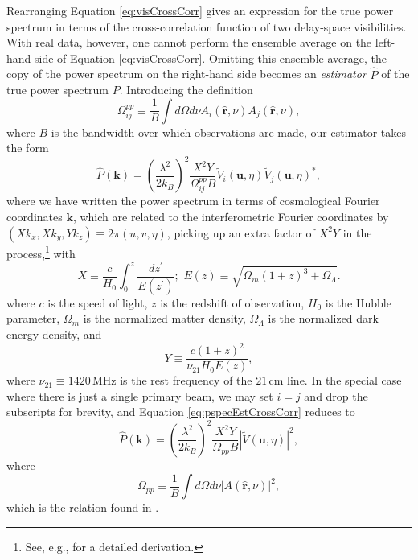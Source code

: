 \documentclass[twocolumn,apj,numberedappendix]{emulateapj}
\newcommand{\rhat}{\hat{\mathbf{r}}}
\begin{document}
Rearranging Equation \eqref{eq:visCrossCorr} gives an expression for the true power spectrum in terms of the cross-correlation function of two delay-space visibilities. With real data, however, one cannot perform the ensemble average on the left-hand side of Equation \eqref{eq:visCrossCorr}. Omitting this ensemble average, the copy of the power spectrum on the right-hand side becomes an \emph{estimator} $\widehat{P}$ of the true power spectrum $P$. Introducing the definition
\begin{equation}
\label{eq:Omega_ij_def}
\Omega_{ij}^{pp} \equiv \frac{1}{B} \int d\Omega d\nu A_i (\rhat,\nu) A_j (\rhat,\nu),
\end{equation}
where $B$ is the bandwidth over which observations are made, our estimator takes the form
\begin{equation}
\label{eq:pspecEstCrossCorr}
\widehat{P} (\mathbf{k}) = \left( \frac{\lambda^2}{2 k_B} \right)^2 \frac{X^2 Y}{\Omega^{pp}_{ij} B} \widetilde{V}_i(\mathbf{u},\eta) \widetilde{V}_j(\mathbf{u},\eta)^*,
\end{equation}
where we have written the power spectrum in terms of cosmological Fourier coordinates $\mathbf{k}$, which are related to the interferometric Fourier coordinates by $(X k_x, X k_y, Y k_z) \equiv 2 \pi (u , v, \eta)$, picking up an extra factor of $X^2 Y$ in the process,\footnote{See, e.g., \citet{liu_et_al2014a} for a detailed derivation.} with
\begin{equation}
X \equiv \frac{c}{H_0} \int_0^z \frac{dz^\prime}{E(z^\prime)}; \,\, E(z) \equiv \sqrt{\Omega_m (1+z)^3 + \Omega_\Lambda}.
\end{equation}
where $c$ is the speed of light, $z$ is the redshift of observation, $H_0$ is the Hubble parameter, $\Omega_m$ is the normalized matter density, $\Omega_\Lambda$ is the normalized dark energy density, and
\begin{equation}
Y \equiv  \frac{c(1+z)^2}{\nu_{21} H_0 E(z)},
\end{equation}
where $\nu_{21} \equiv 1420\,\textrm{MHz}$ is the rest frequency of the $21\,\textrm{cm}$ line. In the special case where there is just a single primary beam, we may set $i=j$ and drop the subscripts for brevity, and Equation \eqref{eq:pspecEstCrossCorr} reduces to
\begin{equation}
\label{eq:P14est}
\widehat{P} (\mathbf{k}) = \left( \frac{\lambda^2}{2 k_B} \right)^2 \frac{X^2 Y}{\Omega_{pp} B} | \widetilde{V}(\mathbf{u},\eta) |^2,
\end{equation}
where
\begin{equation}
\Omega_{pp} \equiv \frac{1}{B} \int d\Omega d\nu |A (\rhat,\nu)|^2,
\end{equation}
which is the relation found in \citet{P14}.
\end{document}
